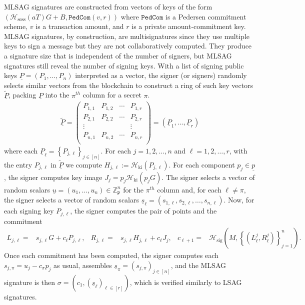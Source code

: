 \documentclass{iacrtrans}
\theoremstyle{definition}
\numberwithin{theorem}{subsection}
\numberwithin{lemma}{theorem}
\newcommand{\scalarField}{\mathbb{Z}_{\mathfrak{p}}}
\begin{document}
MLSAG signatures are constructed from vectors of keys of the form $(\mathcal{H}_{\text{sess}}(a T) G + B, \texttt{PedCom}(v, r))$ where $\texttt{PedCom}$ is a Pedersen commitment scheme, $v$ is a transaction amount, and $r$ is a private amount-commitment key. MLSAG signatures, by construction, are multisignatures since they use multiple keys to sign a message but they are not collaboratively computed. They produce a signature size that is independent of the number of signers, but MLSAG signatures still reveal the number of signing keys. With a list of signing public keys $\underline{P} = (P_1,\ldots,P_n)$ interpreted as a vector, the signer (or signers) randomly selects similar vectors from the blockchain to construct a ring of such key vectors $\widetilde{\underline{P}}$, packing $\underline{P}$ into the $\pi^{th}$ column for a secret $\pi$. \begin{align*}
\widetilde{\underline{P}} = 
\begin{pmatrix} 
P_{1,1} & P_{1, 2} & \cdots & P_{1, r} \\
P_{2,1} & P_{2, 2} & \cdots & P_{2, r} \\
\vdots &  & & \vdots \\
P_{n,1} & P_{n, 2} & \cdots & P_{n,r} \\
\end{pmatrix} = (\underline{P}_1, \ldots, \underline{P}_r)\end{align*} where each $\underline{P}_\ell = \left\{P_{j,\ell}\right\}_{j \in [n]}$. For each $j = 1, 2, \ldots, n$ and $\ell = 1, 2, \ldots, r$, with the entry $P_{j,\ell}$ in $\widetilde{\underline{P}}$ we compute $H_{j,\ell} := \mathcal{H}_{\text{ki}}(P_{j,\ell})$. For each component $p_j \in \underline{p}$, the signer computes key image $J_j = p_j \mathcal{H}_{\text{ki}}(p_j G)$. The signer selects a vector of random scalars $\underline{u} = (u_1, \ldots, u_n) \in \scalarField^n$ for the $\pi^{th}$ column and, for each $\ell \neq \pi$, the signer selects a vector of random scalars $\underline{s}_\ell = (s_{1,\ell}, s_{2,\ell}, \ldots, s_{n,\ell})$. Now, for each signing key $P_{j, \ell}$, the signer computes the pair of points and the commitment
\begin{align*}
L_{j, \ell} =& s_{j,\ell} G + c_\ell P_{j, \ell},  & R_{j,\ell} =& s_{j,\ell} H_{j, \ell} + c_\ell J_j, &
c_{\ell+1} =& \mathcal{H}_{\text{sig}}\left(M,\left\{(L_{\ell}^{j}, R_{\ell}^{j} )\right\}_{j=1}^{n}\right).
\end{align*}
Once each commitment has been computed, the signer computes each $s_{j,\pi} = u_j - c_\pi p_j$ as usual, assembles $\underline{s}_\pi = (s_{j, \pi})_{j \in [n]}$, and the MLSAG signature is then $\sigma = (c_1, (\underline{s}_\ell)_{\ell \in [r]})$, which is verified similarly to LSAG signatures. 
\end{document}
